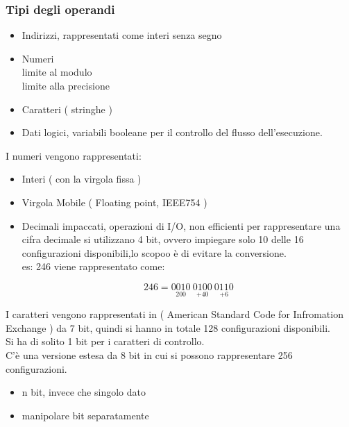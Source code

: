 \documentclass[arch.tex]{subfiles}
\begin{document}
\subsubsection{Tipi degli operandi}

\begin{itemize}
	\item Indirizzi, rappresentati come interi senza segno
	\item Numeri\\
		limite al modulo\\
		limite alla precisione
	\item Caratteri ( stringhe ) 
	\item Dati logici, variabili booleane per il controllo del flusso 
		dell'esecuzione.
\end{itemize}

I numeri vengono rappresentati:

\begin{itemize}
	\item Interi ( con la virgola fissa ) 
	\item Virgola Mobile ( Floating point, IEEE754 ) 
	\item Decimali impaccati, operazioni di I/O,
		non efficienti per rappresentare una cifra decimale
		si utilizzano 4 bit, ovvero impiegare solo 10 delle 16 configurazioni
		disponibili,lo scopoo è di evitare la conversione.\\
		es: 246 viene rappresentato come:

		\begin{equation}
			246 = \underset{200}{0010}\ \underset{ + 40	}{0100}\
			\underset{ + 6}{0110}
		\end{equation}
\end{itemize}
I caratteri vengono rappresentati in  ( American Standard Code for
Infromation Exchange ) da 7 bit, quindi si hanno in totale 128 configurazioni
disponibili.\\
Si ha di solito 1 bit per i caratteri di controllo.\\
C'è una versione estesa da 8 bit in cui si possono rappresentare 256 configurazioni.

%
\label{ppar:Dati logici}

\begin{itemize}
	\item n bit, invece che singolo dato
	\item manipolare bit separatamente
\end{itemize}
\end{document}
